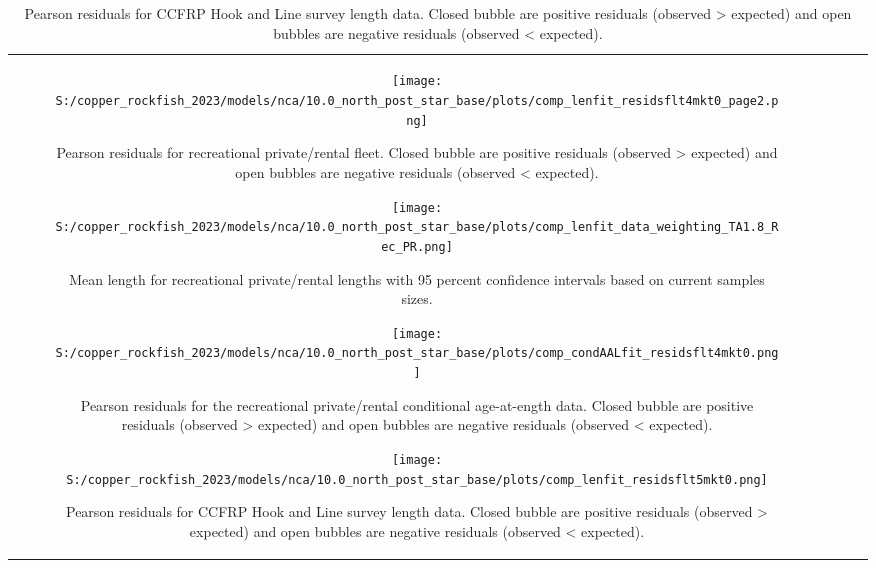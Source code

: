\documentclass[11pt,
  letterpaper,
]{article}
\begin{document}
\begin{longtable}[t]{c>{\centering\arraybackslash}p{2cm}>{\centering\arraybackslash}p{2cm}>{\centering\arraybackslash}p{2cm}}
\pagebreak

\begin{figure}
{\centering
\texttt{[image: S:/copper\_rockfish\_2023/models/nca/10.0\_north\_post\_star\_base/plots/comp\_lenfit\_residsflt4mkt0\_page2.png]}
}
\caption{Pearson residuals for recreational private/rental fleet. Closed bubble are positive residuals (observed > expected) and open bubbles are negative residuals (observed < expected).\label{fig:rec-pr-pearson}}
\end{figure}

\pagebreak

\begin{figure}
{\centering
\texttt{[image: S:/copper\_rockfish\_2023/models/nca/10.0\_north\_post\_star\_base/plots/comp\_lenfit\_data\_weighting\_TA1.8\_Rec\_PR.png]}
}
\caption{Mean length for recreational private/rental lengths with 95 percent confidence intervals based on current samples sizes.\label{fig:rec-pr-mean-len-fit}}
\end{figure}

\pagebreak

\begin{figure}
{\centering
\texttt{[image: S:/copper\_rockfish\_2023/models/nca/10.0\_north\_post\_star\_base/plots/comp\_condAALfit\_residsflt4mkt0.png]}
}
\caption{Pearson residuals for the recreational private/rental conditional age-at-ength data. Closed bubble are positive residuals (observed > expected) and open bubbles are negative residuals (observed < expected).\label{fig:rec-pr-age-pearson}}
\end{figure}

\begin{figure}
{\centering
\texttt{[image: S:/copper\_rockfish\_2023/models/nca/10.0\_north\_post\_star\_base/plots/comp\_lenfit\_residsflt5mkt0.png]}
}
\caption{Pearson residuals for CCFRP Hook and Line survey length data. Closed bubble are positive residuals (observed > expected) and open bubbles are negative residuals (observed < expected).\label{fig:ccfrp-len-pearson}}
\end{figure}

\pagebreak


\end{longtable}
\end{document}

